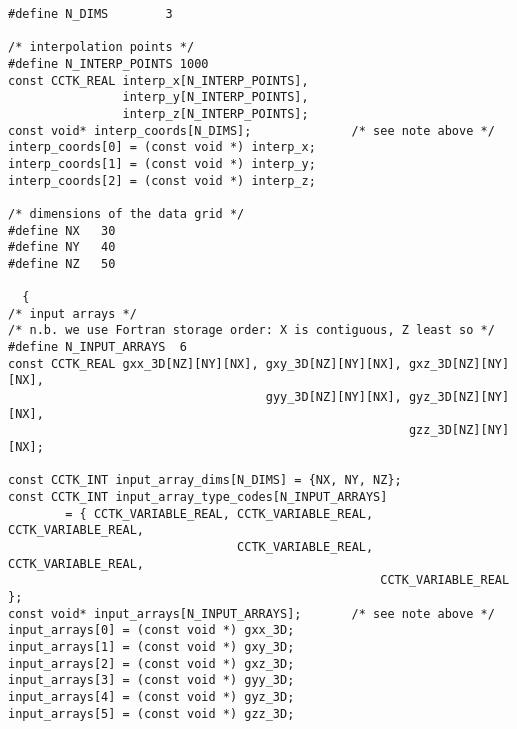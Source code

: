 \begin{verbatim}
#define N_DIMS        3

/* interpolation points */
#define N_INTERP_POINTS 1000
const CCTK_REAL interp_x[N_INTERP_POINTS],
                interp_y[N_INTERP_POINTS],
                interp_z[N_INTERP_POINTS];
const void* interp_coords[N_DIMS];              /* see note above */
interp_coords[0] = (const void *) interp_x;
interp_coords[1] = (const void *) interp_y;
interp_coords[2] = (const void *) interp_z;

/* dimensions of the data grid */
#define NX   30
#define NY   40
#define NZ   50

  {
/* input arrays */
/* n.b. we use Fortran storage order: X is contiguous, Z least so */
#define N_INPUT_ARRAYS  6
const CCTK_REAL gxx_3D[NZ][NY][NX], gxy_3D[NZ][NY][NX], gxz_3D[NZ][NY][NX],
                                    gyy_3D[NZ][NY][NX], gyz_3D[NZ][NY][NX],
                                                        gzz_3D[NZ][NY][NX];

const CCTK_INT input_array_dims[N_DIMS] = {NX, NY, NZ};
const CCTK_INT input_array_type_codes[N_INPUT_ARRAYS]
        = { CCTK_VARIABLE_REAL, CCTK_VARIABLE_REAL, CCTK_VARIABLE_REAL,
                                CCTK_VARIABLE_REAL, CCTK_VARIABLE_REAL,
                                                    CCTK_VARIABLE_REAL };
const void* input_arrays[N_INPUT_ARRAYS];       /* see note above */
input_arrays[0] = (const void *) gxx_3D;
input_arrays[1] = (const void *) gxy_3D;
input_arrays[2] = (const void *) gxz_3D;
input_arrays[3] = (const void *) gyy_3D;
input_arrays[4] = (const void *) gyz_3D;
input_arrays[5] = (const void *) gzz_3D;


\end{verbatim}
